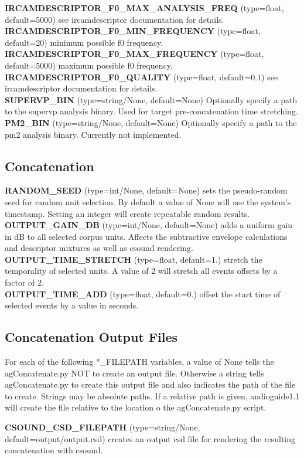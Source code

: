 \documentclass{article}
\newcommand{\optEntry}[4]{\textbf{#1} (type=#2, default=#3) #4\hspace{0.5em}\\}
\newcommand{\ag}{audioguide1.1 }
\begin{document}
\begin{spacing}{1.2}
\optEntry{IRCAMDESCRIPTOR\_F0\_MAX\_ANALYSIS\_FREQ}{float}{5000}{see ircamdescriptor documentation for details.}

\optEntry{IRCAMDESCRIPTOR\_F0\_MIN\_FREQUENCY}{float}{20}{minimum possible f0 frequency.}

\optEntry{IRCAMDESCRIPTOR\_F0\_MAX\_FREQUENCY}{float}{5000}{maximum possible f0 frequency.}

\optEntry{IRCAMDESCRIPTOR\_F0\_QUALITY}{float}{0.1}{see ircamdescriptor documentation for details.}

\optEntry{SUPERVP\_BIN}{string/None}{None}{Optionally specify a path to the supervp analysis binary.  Used for target pre-concatenation time stretching.}

\optEntry{PM2\_BIN}{string/None}{None}{Optionally specify a path to the pm2 analysis binary.  Currently not implemented.}


\subsection{Concatenation}
\optEntry{RANDOM\_SEED}{int/None}{None}{sets the pseudo-random seed for random unit selection.  By default a value of None will use the system's timestamp.  Setting an integer will create repeatable random results.}

\optEntry{OUTPUT\_GAIN\_DB}{int/None}{None}{adds a uniform gain in dB to all selected corpus units.  Affects the subtractive envelope calculations and descriptor mixtures as well as csound rendering.}

\optEntry{OUTPUT\_TIME\_STRETCH}{float}{1.}{stretch the temporality of selected units.  A value of 2 will stretch all events offsets by a factor of 2.}

\optEntry{OUTPUT\_TIME\_ADD}{float}{0.}{offset the start time of selected events by a value in seconds.}

\subsection{Concatenation Output Files}\label{outputfiles}
For each of the following *\_FILEPATH variables, a value of None tells the agConcatenate.py NOT to create an output file.  Otherwise a string tells agConcatenate.py to create this output file and also indicates the path of the file to create.  Strings may be absolute paths.  If a relative path is given, \ag will create the file relative to the location o the agConcatenate.py script.

\optEntry{CSOUND\_CSD\_FILEPATH}{string/None}{output/output.csd}{creates an output csd file for rendering the resulting concatenation with csound.}


\end{spacing}
\end{document}
